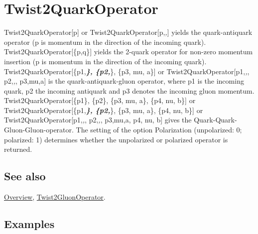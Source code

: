 \documentclass[../FeynCalcManual.tex]{subfiles}
\begin{document}
\hypertarget{twist2quarkoperator}{
\section{Twist2QuarkOperator}\label{twist2quarkoperator}}

Twist2QuarkOperator{[}p{]} or Twist2QuarkOperator{[}p,\emph{,}{]} yields
the quark-antiquark operator (p is momentum in the direction of the
incoming quark). Twist2QuarkOperator{[}\{p,q\}{]} yields the 2-quark
operator for non-zero momentum insertion (p is momentum in the direction
of the incoming quark). Twist2QuarkOperator{[}\{p1,\textbf{\emph{\},
\{p2,}}\}, \{p3, mu, a\}{]} or Twist2QuarkOperator{[}p1,\emph{,},
p2,\emph{,}, p3,mu,a{]} is the quark-antiquark-gluon operator, where p1
is the incoming quark, p2 the incoming antiquark and p3 denotes the
incoming gluon momentum. Twist2QuarkOperator{[}\{p1\}, \{p2\}, \{p3, mu,
a\}, \{p4, nu, b\}{]} or Twist2QuarkOperator{[}\{p1,\textbf{\emph{\},
\{p2,}}\}, \{p3, mu, a\}, \{p4, nu, b\}{]} or
Twist2QuarkOperator{[}p1,\emph{,}, p2,\emph{,}, p3,mu,a, p4, nu, b{]}
gives the Quark-Quark-Gluon-Gluon-operator. The setting of the option
Polarization (unpolarized: 0; polarized: 1) determines whether the
unpolarized or polarized operator is returned.

\subsection{See also}

\hyperlink{toc}{Overview},
\hyperlink{twist2gluonoperator}{Twist2GluonOperator}.

\subsection{Examples}
\end{document}
